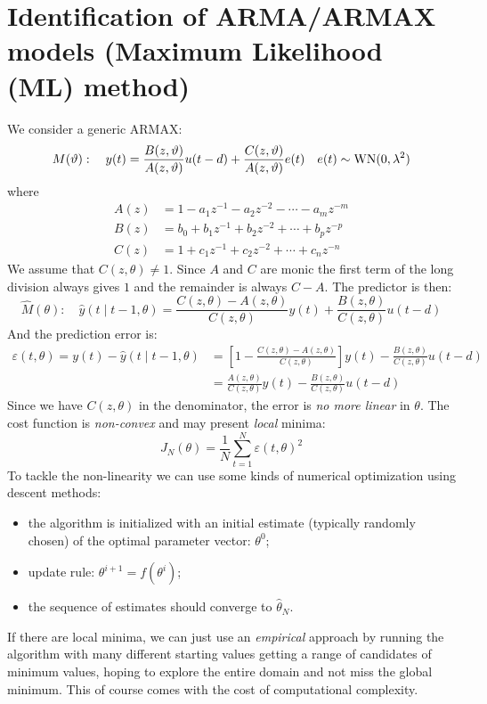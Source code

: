 
\section{Identification of ARMA/ARMAX models (Maximum Likelihood (ML) method)}

We consider a generic ARMAX:
\[
	M(\vartheta ): \quad y(t)=\frac{B(z,\vartheta )}{A(z,\vartheta)} u(t-d)+\frac{C(z,\vartheta )}{A(z,\vartheta)}e(t)\quad e(t)\sim \operatorname{WN}(0,\lambda^2)
\]
where
\begin{align*}
	A(z)&=1-a_{1} z^{-1}-a_{2} z^{-2}-\cdots-a_{m} z^{-m} \\
	B(z)&=b_{0}+b_{1} z^{-1}+b_{2} z^{-2}+\cdots+b_{p} z^{-p} \\
	C(z)&=1+c_{1} z^{-1}+c_{2} z^{-2}+\cdots+c_{n} z^{-n}
\end{align*}
We assume that $C(z,\theta)\neq 1$. Since $A$ and $C$ are monic the first term of the long division always gives $1$ and the remainder is always $C-A$. The predictor is then:
\[
	\hat{M}(\theta): \quad \hat{y}(t \mid t-1, \theta)=\frac{C(z,\theta)-A(z,\theta)}{C(z,\theta)} y(t)+\frac{B(z,\theta)}{C(z,\theta)} u(t-d)
\]
And the prediction error is:
\begin{align*}
	\varepsilon(t, \theta)=y(t)-\hat{y}(t \mid t-1, \theta)&=\left[1-\frac{C(z,\theta)-A(z,\theta)}{C(z,\theta)}\right] y(t)-\frac{B(z,\theta)}{C(z,\theta)} u(t-d)\\
	&=\frac{A(z,\theta)}{C(z,\theta)} y(t)-\frac{B(z,\theta)}{C(z,\theta)} u(t-d)
\end{align*}
Since we have $C(z,\theta)$ in the denominator, the error is \emph{no more linear} in $\theta$.
The cost function is \emph{non-convex} and may present \emph{local} minima:
\[
	J_{N}(\theta)=\frac{1}{N} \sum_{t=1}^{N} \varepsilon(t, \theta)^{2}
\]
To tackle the non-linearity we can use some kinds of numerical optimization using descent methods:
\begin{itemize}
	\item the algorithm is initialized with an initial estimate (typically randomly chosen) of the optimal parameter vector: $\theta^{0}$;
	\item update rule: $\theta^{i+1} = f (\theta^{i})$;
	\item the sequence of estimates should converge to $\hat\theta_{N}$.
\end{itemize}
If there are local minima, we can just use an \emph{empirical} approach by running the algorithm with many different starting values getting a range of candidates of minimum values, hoping to explore the entire domain and not miss the global minimum. This of course comes with the cost of computational complexity.



